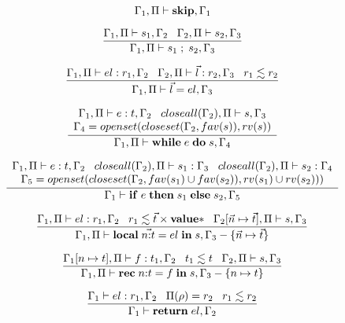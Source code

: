 \noindent

\[
\Gamma_{1}, \Pi \vdash \mathbf{skip}, \Gamma_{1}
\]

\[
\dfrac{\Gamma_{1}, \Pi \vdash s_{1}, \Gamma_{2} \;\;\;
       \Gamma_{2}, \Pi \vdash s_{2}, \Gamma_{3}}
      {\Gamma_{1}, \Pi \vdash s_{1} \; ; \; s_{2}, \Gamma_{3}}
\]

\[
\dfrac{\Gamma_{1}, \Pi \vdash el:r_{1}, \Gamma_{2} \;\;\;
       \Gamma_{2}, \Pi \vdash \vec{l}:r_{2}, \Gamma_{3} \;\;\;
       r_{1} \lesssim r_{2}}
      {\Gamma_{1}, \Pi \vdash \vec{l} = el,\Gamma_{3}}
\]

\[
\dfrac{\begin{array}{c}
       \Gamma_{1}, \Pi \vdash e:t, \Gamma_{2} \;\;\;
       closeall(\Gamma_{2}), \Pi \vdash s, \Gamma_{3}\\
       \Gamma_{4} = openset(closeset(\Gamma_{2}, fav(s)),rv(s))
       \end{array}}
      {\Gamma_{1}, \Pi \vdash \mathbf{while} \; e \; \mathbf{do} \; s,\Gamma_{4}}
\]

\[
\dfrac{\begin{array}{c}
       \Gamma_{1}, \Pi \vdash e:t, \Gamma_{2} \;\;\;
       closeall(\Gamma_{2}), \Pi \vdash s_{1}:\Gamma_{3} \;\;\;
       closeall(\Gamma_{2}), \Pi \vdash s_{2}:\Gamma_{4} \\
       \Gamma_{5} = openset(closeset(\Gamma_{2}, fav(s_{1}) \cup fav(s_{2})),rv(s_{1}) \cup rv(s_{2})))
       \end{array}}
      {\Gamma_{1} \vdash \mathbf{if} \; e \; \mathbf{then} \; s_{1} \; \mathbf{else} \; s_{2}, \Gamma_{5}}
\]

\[
\dfrac{\Gamma_{1}, \Pi \vdash el:r_{1}, \Gamma_{2} \;\;\;
       r_{1} \lesssim \vec{t} \times \mathbf{value}{*} \;\;\;
       \Gamma_{2}[\vec{n} \mapsto \vec{t}], \Pi \vdash s, \Gamma_{3}}
      {\Gamma_{1}, \Pi \vdash \mathbf{local} \; \vec{n{:}t} = el \; \mathbf{in} \; s, \Gamma_{3} - \{\vec{n} \mapsto \vec{t}\}}
\]

\[
\dfrac{\Gamma_{1}[n \mapsto t], \Pi \vdash f:t_{1}, \Gamma_{2} \;\;\;
       t_{1} \lesssim t \;\;\;
       \Gamma_{2}, \Pi \vdash s, \Gamma_{3}}
      {\Gamma_{1}, \Pi \vdash \mathbf{rec} \; n{:}t = f \; \mathbf{in} \; s, \Gamma_{3} - \{n \mapsto t\}}
\]

\[
\dfrac{\Gamma_{1} \vdash el:r_{1}, \Gamma_{2} \;\;\;
       \Pi(\rho) = r_{2} \;\;\;
       r_{1} \lesssim r_{2}}
      {\Gamma_{1} \vdash \mathbf{return} \; el, \Gamma_{2}}
\]

